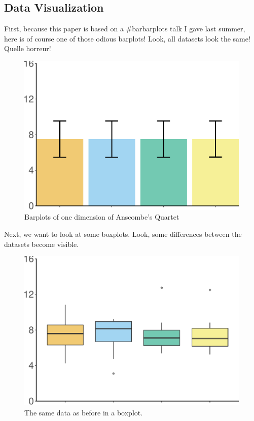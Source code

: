 \documentclass[english,floatsintext,man]{apa6}
\begin{document}
\subsection{Data Visualization}\label{data-visualization}

First, because this paper is based on a \#barbarplots talk I gave last
summer, here is of course one of those odious barplots! Look, all
datasets look the same! Quelle horreur!

\begin{figure}[htbp]
\centering
\includegraphics{APA_Tidy_Paper_files/figure-latex/test-1.pdf}
\caption{\label{fig:test}Barplots of one dimension of Anscombe's Quartet}
\end{figure}

Next, we want to look at some boxplots. Look, some differences between
the datasets become visible.

\begin{figure}[htbp]
\centering
\includegraphics{APA_Tidy_Paper_files/figure-latex/unnamed-chunk-1-1.pdf}
\caption{\label{fig:unnamed-chunk-1}The same data as before in a boxplot.}
\end{figure}
\end{document}
